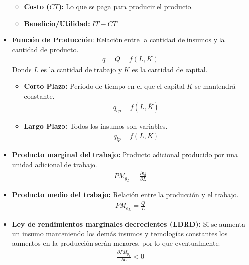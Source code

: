 \documentclass{templateNote}
\begin{document}
\begin{itemize}
\begin{itemize}
        \item \textbf{Costo ($CT$):} Lo que se paga para producir el producto.
        
        \item \textbf{Beneficio/Utilidad:} $IT - CT$
    \end{itemize}

    \item \textbf{Función de Producción:} Relación entre la cantidad de insumos y la cantidad de producto.
    \begin{align*}
        q = Q = f(L,K)
    \end{align*}
    Donde $L$ es la cantidad de trabajo y $K$ es la cantidad de capital.
    \begin{itemize}
        \item \textbf{Corto Plazo:} Periodo de tiempo en el que el capital $K$ se mantendrá constante.
        \begin{align*}
            q_{cp} = f(L, \overline{K})
        \end{align*}
        
        \item \textbf{Largo Plazo:} Todos los insumos son variables.
        \begin{align*}
            q_{lp} = f(L,K)
        \end{align*}
    \end{itemize}

    \item \textbf{Producto marginal del trabajo:} Producto adicional producido por una unidad adicional
    de trabajo.
    \begin{align*}
        PM_{g_{L}} = \frac{\partial Q}{\partial L}
    \end{align*}

    \item \textbf{Producto medio del trabajo:} Relación entre la producción y el trabajo.
    \begin{align*}
        PM_{e_{L}} = \frac{Q}{L}
    \end{align*}

    \item \textbf{Ley de rendimientos marginales decrecientes (LDRD):} Si se aumenta un insumo manteniendo
    los demás insumos y tecnologías constantes los aumentos en la producción serán menores, por lo
    que eventualmente:
    \begin{align}
        \frac{\partial PM_{g_{L}}}{\partial L} < 0
    \end{align}
    

\end{itemize}
\end{document}
